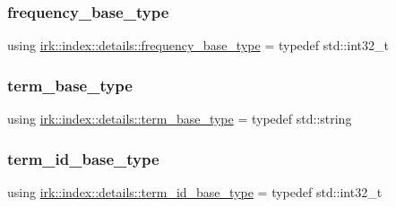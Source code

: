 \subsubsection{\texorpdfstring{frequency\+\_\+base\+\_\+type}{frequency\_base\_type}}
{\footnotesize\ttfamily using \mbox{\hyperlink{namespaceirk_1_1index_1_1details_a4b657cb7a568be2f216aeb3eaff9e71b}{irk\+::index\+::details\+::frequency\+\_\+base\+\_\+type}} = typedef std\+::int32\+\_\+t}

\mbox{\label{namespaceirk_1_1index_1_1details_ae85cb57d6db703cac1c9eb5af11a03f2}} 
\subsubsection{\texorpdfstring{term\+\_\+base\+\_\+type}{term\_base\_type}}
{\footnotesize\ttfamily using \mbox{\hyperlink{namespaceirk_1_1index_1_1details_ae85cb57d6db703cac1c9eb5af11a03f2}{irk\+::index\+::details\+::term\+\_\+base\+\_\+type}} = typedef std\+::string}

\mbox{\label{namespaceirk_1_1index_1_1details_a03b015c00fec26f2586208453b6e99ba}} 
\subsubsection{\texorpdfstring{term\+\_\+id\+\_\+base\+\_\+type}{term\_id\_base\_type}}
{\footnotesize\ttfamily using \mbox{\hyperlink{namespaceirk_1_1index_1_1details_a03b015c00fec26f2586208453b6e99ba}{irk\+::index\+::details\+::term\+\_\+id\+\_\+base\+\_\+type}} = typedef std\+::int32\+\_\+t}


